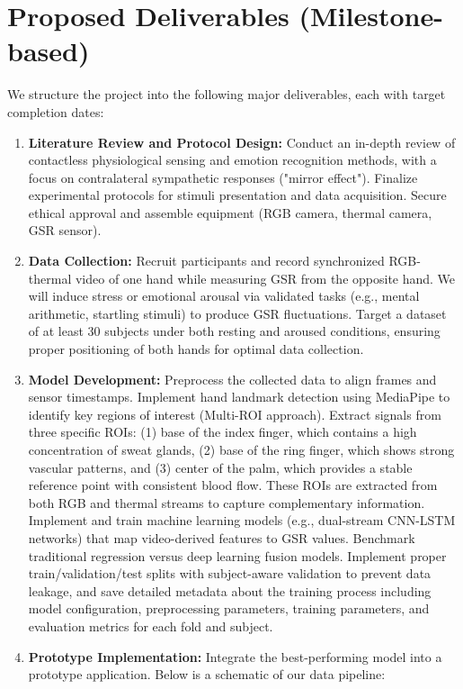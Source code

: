 \documentclass[12pt]{article}
\begin{document}
    \section{Proposed Deliverables (Milestone-based)}
    We structure the project into the following major deliverables, each with target completion dates:
    \begin{enumerate}
        \item \textbf{Literature Review and Protocol Design:} Conduct an in-depth review of contactless physiological sensing and emotion recognition methods, with a focus on contralateral sympathetic responses ("mirror effect"). Finalize experimental protocols for stimuli presentation and data acquisition. Secure ethical approval and assemble equipment (RGB camera, thermal camera, GSR sensor).
        \item \textbf{Data Collection:} Recruit participants and record synchronized RGB-thermal video of one hand while measuring GSR from the opposite hand. We will induce stress or emotional arousal via validated tasks (e.g., mental arithmetic, startling stimuli) to produce GSR fluctuations. Target a dataset of at least 30 subjects under both resting and aroused conditions, ensuring proper positioning of both hands for optimal data collection.
        \item \textbf{Model Development:} Preprocess the collected data to align frames and sensor timestamps. Implement hand landmark detection using MediaPipe to identify key regions of interest (Multi-ROI approach). Extract signals from three specific ROIs: (1) base of the index finger, which contains a high concentration of sweat glands, (2) base of the ring finger, which shows strong vascular patterns, and (3) center of the palm, which provides a stable reference point with consistent blood flow. These ROIs are extracted from both RGB and thermal streams to capture complementary information. Implement and train machine learning models (e.g., dual-stream CNN-LSTM networks) that map video-derived features to GSR values. Benchmark traditional regression versus deep learning fusion models. Implement proper train/validation/test splits with subject-aware validation to prevent data leakage, and save detailed metadata about the training process including model configuration, preprocessing parameters, training parameters, and evaluation metrics for each fold and subject.
        \item \textbf{Prototype Implementation:} Integrate the best-performing model into a prototype application. Below is a schematic of our data pipeline:

\end{enumerate}
\end{document}
